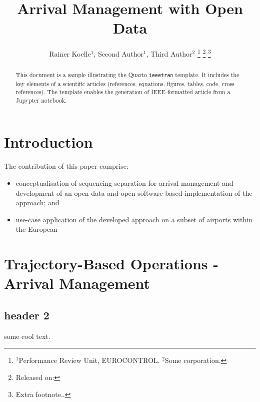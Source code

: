 \documentclass[letterpaper, 10 pt, journal, twoside]{IEEEtran}
\begin{document}
\author{
        Rainer Koelle\(^1\),     Second
Author\(^1\),     Third Author\(^2\)
    \thanks{\(^1\)Performance Review Unit, EUROCONTROL. \(^2\)Some
corporation.}
    \thanks{Released on: }
    \thanks{Extra footnote..}
}


\title{Arrival Management with Open Data}
\maketitle

\begin{abstract}
    This document is a sample illustrating the Quarto \texttt{ieeetran}
    template. It includes the key elements of a scientific articles
    (references, equations, figures, tables, code, cross references).
    The template enables the generation of IEEE-formatted article from a
    Jupypter notebook.
\end{abstract}

\hypertarget{introduction}{%
\section{Introduction}\label{introduction}}

The contribution of this paper comprise:

\begin{itemize}
\item
  conceptualisation of sequencing separation for arrival management and
  development of an open data and open software based implementation of
  the approach; and
\item
  use-case application of the developed approach on a subset of airports
  within the European
\end{itemize}

\hypertarget{trajectory-based-operations---arrival-management}{%
\section{Trajectory-Based Operations - Arrival
Management}\label{trajectory-based-operations---arrival-management}}

\hypertarget{header-2}{%
\subsection{header 2}\label{header-2}}

some cool text.
\end{document}
